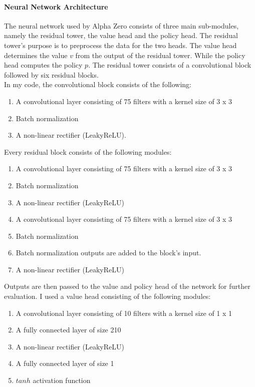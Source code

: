\documentclass[12pt]{article}
\begin{document}
\paragraph{Neural Network Architecture} 
\label{sec:NeruralNetworkArchitecture}
The neural network used by Alpha Zero consists of three main sub-modules, namely the residual tower, the value head and the policy head. The residual tower's purpose is to preprocess the data for the two heads. The value head determines the value \(v\) from the output of the residual tower. While the policy head computes the policy \(p\). The residual tower consists of a convolutional block followed by six residual blocks.\\
In my code, the convolutional block consists of the following: 
\begin{enumerate}
\item A convolutional layer consisting of 75 filters with a kernel size of 3 x 3
\item Batch normalization \cite{ioffe2015batch}
\item A non-linear rectifier (LeakyReLU).
\end{enumerate}
Every residual block consists of the following modules:
\begin{enumerate}
\item A convolutional layer consisting of 75 filters with a kernel size of 3 x 3
\item Batch normalization
\item A non-linear rectifier (LeakyReLU)
\item A convolutional layer consisting of 75 filters with a kernel size of 3 x 3
\item Batch normalization
\item Batch normalization outputs are added to the block's input.
\item A non-linear rectifier (LeakyReLU)
\end{enumerate}
Outputs are then passed to the value and policy head of the network for further evaluation.
I used a value head consisting of the following modules:
\begin{enumerate}
\item A convolutional layer consisting of 10 filters with a kernel size of 1 x 1
\item A fully connected layer of size 210
\item A non-linear rectifier (LeakyReLU)
\item A fully connected layer of size 1
\item \(tanh\) activation function
\end{enumerate}
\end{document}
